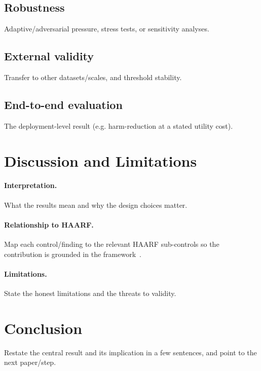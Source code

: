 \documentclass[11pt]{article}
\begin{document}
\subsection{Robustness}\label{sec:robustness}
Adaptive/adversarial pressure, stress tests, or sensitivity analyses.

\subsection{External validity}\label{sec:external}
Transfer to other datasets/scales, and threshold stability.

\subsection{End-to-end evaluation}\label{sec:endtoend}
The deployment-level result (e.g. harm-reduction at a stated utility cost).

\section{Discussion and Limitations}
\paragraph{Interpretation.} What the results mean and why the design choices matter.

\paragraph{Relationship to HAARF.} Map each control/finding to the relevant HAARF
sub-controls so the contribution is grounded in the framework~\cite{schwoebel2026haarf}.

\paragraph{Limitations.} State the honest limitations and the threats to validity.

\section{Conclusion}
Restate the central result and its implication in a few sentences, and point to the
next paper/step.

\end{document}
